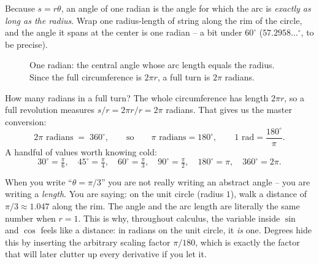 Because $s = r\theta$, an angle of one radian is the angle for which the arc is \emph{exactly as long as the radius}. Wrap one radius-length of string along the rim of the circle, and the angle it spans at the center is one radian -- a bit under $60^\circ$ ($57.2958\ldots^\circ$, to be precise).

\begin{figure}[H]
\centering
{}
\caption{One radian: the central angle whose arc length equals the radius. Since the full circumference is $2\pi r$, a full turn is $2\pi$ radians.}
\label{ch04:fig-radian}
\end{figure}

How many radians in a full turn? The whole circumference has length $2\pi r$, so a full revolution measures $s/r = 2\pi r / r = 2\pi$ radians. That gives us the master conversion:
\[
  2\pi \text{ radians} \;=\; 360^\circ,
  \qquad\text{so}\qquad
  \pi \text{ radians} = 180^\circ,
  \qquad
  1 \text{ rad} = \frac{180^\circ}{\pi}.
\]
A handful of values worth knowing cold:
\[
  30^\circ = \tfrac{\pi}{6},\quad
  45^\circ = \tfrac{\pi}{4},\quad
  60^\circ = \tfrac{\pi}{3},\quad
  90^\circ = \tfrac{\pi}{2},\quad
  180^\circ = \pi,\quad
  360^\circ = 2\pi.
\]

\begin{happeningbox}
When you write ``$\theta = \pi/3$'' you are not really writing an abstract angle -- you are writing a \emph{length}. You are saying: on the unit circle (radius $1$), walk a distance of $\pi/3 \approx 1.047$ along the rim. The angle and the arc length are literally the same number when $r=1$. This is why, throughout calculus, the variable inside $\sin$ and $\cos$ feels like a distance: in radians on the unit circle, it \emph{is} one. Degrees hide this by inserting the arbitrary scaling factor $\pi/180$, which is exactly the factor that will later clutter up every derivative if you let it.
\end{happeningbox}

